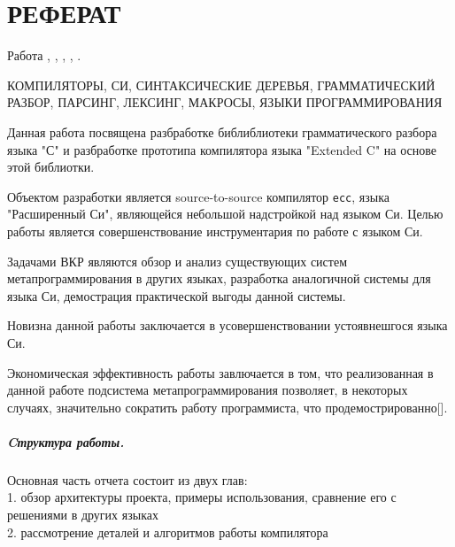 \chapter*{РЕФЕРАТ}

Работа , 
    ,
    ,
    ,
    .

    КОМПИЛЯТОРЫ, СИ, СИНТАКСИЧЕСКИЕ ДЕРЕВЬЯ, ГРАММАТИЧЕСКИЙ РАЗБОР, ПАРСИНГ, ЛЕКСИНГ, МАКРОСЫ, ЯЗЫКИ ПРОГРАММИРОВАНИЯ %

    \vspace{5mm}
Данная работа посвящена разбработке библиблиотеки грамматического разбора языка "С" и разбработке прототипа компилятора языка "Extended C" на основе этой библиотки.

Объектом разработки является source-to-source компилятор \verb|ecc|, языка "Расширенный Си", являющейся небольшой надстройкой над языком Си.
Целью работы является совершенствование инструментария по работе с языком Си.

Задачами ВКР являются обзор и анализ существующих систем метапрограммирования в других языках, 
разработка аналогичной системы для языка Си,
демострация практической выгоды данной системы.

Новизна данной работы заключается в усовершенствовании устоявнешгося языка Си.

Экономическая эффективность работы завлючается в том, что реализованная в данной работе подсистема метапрограммирования позволяет, в некоторых случаях, значительно сократить работу программиста, что продемострированно[]. %

\paragraph*{Cтруктура работы.} Основная часть отчета состоит из двух глав:\\
1. обзор архитектуры проекта, примеры использования, сравнение его с решениями в других языках\\
2. рассмотрение деталей и алгоритмов работы компилятора


